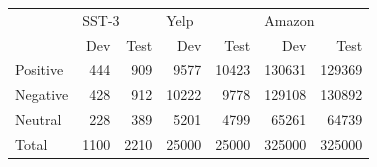 \begin{tabular}{lrrrrrr}
\toprule
{} & \multicolumn{2}{l}{SST-3} & \multicolumn{2}{l}{Yelp} & \multicolumn{2}{l}{Amazon} \\
{} &   Dev &  Test &    Dev &   Test &     Dev &    Test \\
\midrule
Positive &   444 &   909 &   9577 &  10423 &  130631 &  129369 \\
Negative &   428 &   912 &  10222 &   9778 &  129108 &  130892 \\
Neutral  &   228 &   389 &   5201 &   4799 &   65261 &   64739 \\
Total    &  1100 &  2210 &  25000 &  25000 &  325000 &  325000 \\
\bottomrule
\end{tabular}
